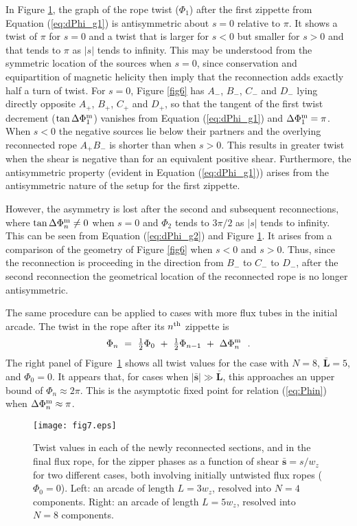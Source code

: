 \documentclass[10pt,namedreferneces]{SolarPhysics}
\begin{document}
\begin{article}
In Figure \ref{fig7}, the graph of the rope twist ($\Phi_1$) after the first zippette from Equation (\ref{eq:dPhi_g1}) is antisymmetric about $s=0$ relative to $\pi$. It shows a twist of $\pi$ for $s=0$ and a twist that is larger for $s<0$ but smaller for $s>0$ and that tends to $\pi$ as $|s|$ tends to infinity. This may be understood from the symmetric location of the sources when $s=0$, since conservation and equipartition of magnetic helicity then imply that the reconnection adds exactly half a turn of twist. 
For $s=0$, Figure \ref{fig6} has $A_-$, $B_-$, $C_-$ and $D_-$ lying directly opposite $A_+$, $B_+$, $C_+$ and $D_+$, so that the tangent of the first twist decrement ($\tan \Delta \Phi_1^{\rm m}$) vanishes from Equation (\ref{eq:dPhi_g1}) and $\Delta \Phi_1^{\rm m}=\pi$. When $s<0$ the negative sources lie below their partners and the overlying reconnected rope $A_+B_-$ is shorter than when $s>0$. This results in greater twist when the shear is negative than for an equivalent positive shear. Furthermore, the antisymmetric property (evident in Equation (\ref{eq:dPhi_g1})) arises from the antisymmetric nature of the setup for the first zippette. 

However, the asymmetry is lost after the second and subsequent reconnections, where $\tan\Delta\Phi_n^{\rm m}\neq 0$ when $s=0$ and $\Phi_2$ tends to $3\pi/2$ as $|s|$ tends to infinity.  This can be seen from Equation (\ref{eq:dPhi_g2}) and Figure \ref{fig7}. It arises from a comparison of the geometry of Figure \ref{fig6} when $s<0$ and $s>0$. Thus, since the reconnection is proceeding in the direction from $B_-$ to $C_-$ to $D_-$, after the second reconnection the geometrical location of the reconnected rope is no longer antisymmetric.

The same procedure can be applied to cases with more flux tubes in the initial arcade.  The twist in the rope after its 
$n^{\rm th}$ zippette is 
\begin{equation}
  \Phi_n ~=~  \hbox{${1\over2}$}\Phi_{0} ~+~ \hbox{${1\over2}$}\Phi_{n-1} ~+~ \Delta\Phi_n^{\rm m} ~~.
  	\label{eq:Phin}
\end{equation}
The right panel of Figure\ \ref{fig7} shows all twist values for the case with $N=8$, $\bm\bar{L}=5$, and $\Phi_0=0$. It appears that, for cases when $|\bm\bar{s}|\gg\bm\bar{L}$, this approaches an upper bound of $\Phi_n\approx 2\pi$.  This is the asymptotic fixed point for relation (\ref{eq:Phin}) when $\Delta\Phi^{\rm m}_n\approx\pi$.
\begin{figure}[h]
{\centering
 \texttt{[image: fig7.eps]}
\caption{Twist values in each of the newly reconnected sections, and in the final flux rope, for the zipper phases as a function of shear $\bm\bar{s}=s/w_z$ for two different cases, both involving initially untwisted flux ropes ($\Phi_0=0$).  Left: an arcade of length $L=3w_z$, resolved into $N=4$ components.  Right: an arcade of length $L=5w_z$, resolved into $N=8$ components.}
\label{fig7}}
\end{figure}


\end{article}
\end{document}
